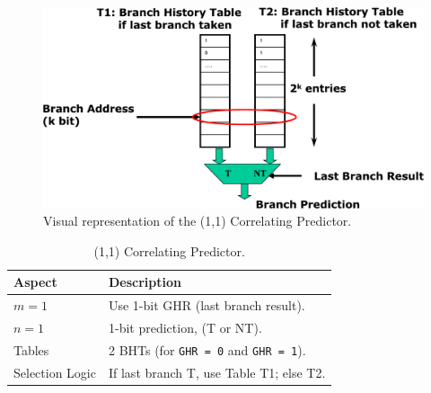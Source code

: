 \newpage

\begin{figure}[!htp]
    \centering
    \includegraphics[width=.9\textwidth]{img/1-1-correlating-predictors.pdf}
    \caption{Visual representation of the (1,1) Correlating Predictor.}
\end{figure}

\begin{table}[!htp]
    \centering
    \begin{tabular}{@{} l | l @{}}
        \toprule
        \textbf{Aspect} & \textbf{Description} \\
        \midrule
        $m = 1$         & Use 1-bit GHR (last branch result).                   \\ [.5em]
        $n = 1$         & 1-bit prediction, (T or NT).                          \\ [.5em]
        Tables          & 2 BHTs (for \texttt{GHR = 0} and \texttt{GHR = 1}).   \\ [.5em]
        Selection Logic & If last branch T, use Table T1; else T2.              \\
        \bottomrule
    \end{tabular}
    \caption{(1,1) Correlating Predictor.}
\end{table}


